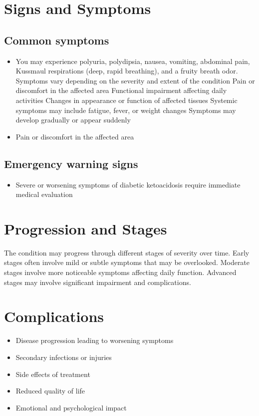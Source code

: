 \section{Signs and Symptoms}

\subsection{Common symptoms}
\begin{itemize}[noitemsep]
  \item You may experience polyuria, polydipsia, nausea, vomiting, abdominal pain, Kussmaul respirations (deep, rapid breathing), and a fruity breath odor. Symptoms vary depending on the severity and extent of the condition Pain or discomfort in the affected area Functional impairment affecting daily activities Changes in appearance or function of affected tissues Systemic symptoms may include fatigue, fever, or weight changes Symptoms may develop gradually or appear suddenly
  \item Pain or discomfort in the affected area
  \end{itemize}

\subsection{Emergency warning signs}
\begin{itemize}[noitemsep]
  \item Severe or worsening symptoms of diabetic ketoacidosis require immediate medical evaluation
\end{itemize}
\section{Progression and Stages}
The condition may progress through different stages of severity over time. Early stages often involve mild or subtle symptoms that may be overlooked. Moderate stages involve more noticeable symptoms affecting daily function. Advanced stages may involve significant impairment and complications.
\section{Complications}
\begin{itemize}[noitemsep]
  \item Disease progression leading to worsening symptoms
  \item Secondary infections or injuries
  \item Side effects of treatment
  \item Reduced quality of life
  \item Emotional and psychological impact
\end{itemize}
